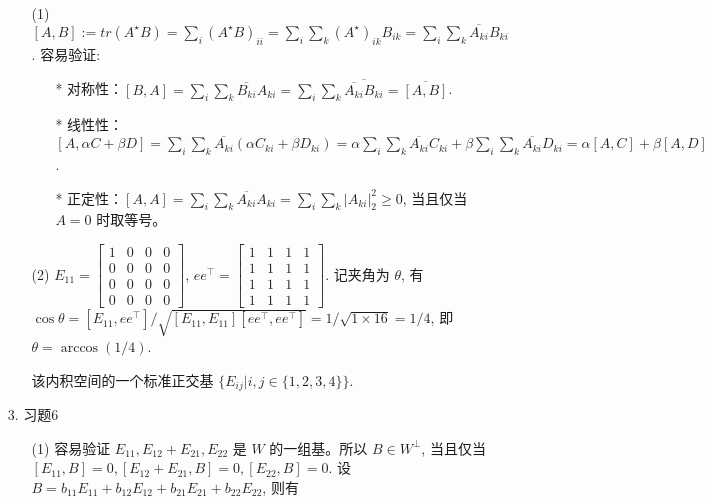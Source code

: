 \documentclass{article}
\begin{document}
\begin{spacing}{1.5}
\begin{enumerate}
    \begin{itemize}
        \item [(1)] $[A, B]:= tr(A^\star B) = \sum_{i} (A^\star B)_{ii} = \sum_{i}\sum_{k} (A^\star)_{ik}B_{ik} = \sum_i\sum_k \overline{A_{ki}}B_{ki}$. 容易验证: 
        \begin{itemize}
            \item [*] 对称性：$[B, A] = \sum_{i}\sum_{k} \overline{B_{ki}}A_{ki} = \sum_i\sum_k \overline{\overline{A_{ki}}B_{ki}} = \overline {[A, B]}$.
            \item [*] 线性性：$[A, \alpha C+ \beta D] = \sum_i\sum_k \overline{A_{ki}}(\alpha C_{ki} + \beta D_{ki}) = \alpha \sum_i\sum_k \overline{A_{ki}}C_{ki} + \beta\sum_i\sum_k \overline{A_{ki}}D_{ki} = \alpha [A, C] + \beta [A, D]$.
            \item [*] 正定性：$[A, A] = \sum_i\sum_k \overline{A_{ki}}A_{ki} = \sum_i\sum_k |A_{ki}|_2^2 \geq 0$, 当且仅当 $A = 0$ 时取等号。
        \end{itemize}
        \item [(2)] $E_{11} = \left[\begin{array}{cccc}1&0&0&0\\0&0&0&0\\0&0&0&0\\0&0&0&0\end{array}\right]$, $ee^\top = \left[\begin{array}{cccc}1&1&1&1\\1&1&1&1\\1&1&1&1\\1&1&1&1\end{array}\right]$. 记夹角为 $\theta$, 有 $\cos \theta = [E_{11}, ee^\top] / \sqrt{[E_{11}, E_{11}][ee^\top, ee^\top]} = 1 / \sqrt{1\times 16} = 1/4$, 即 $\theta = \arccos (1/4)$.
        
        该内积空间的一个标准正交基 $\{E_{ij} | i, j\in\{1,2,3,4\}\}$.
    \end{itemize}

    \item[3.] 习题6
    
    \begin{itemize}
        \item [(1)] 容易验证 $E_{11}, E_{12} + E_{21}, E_{22}$ 是 $W$ 的一组基。所以 $B \in W^\perp$, 当且仅当 $[E_{11}, B] = 0, [E_{12} + E_{21}, B] = 0, [E_{22}, B] = 0$. 设 $B = b_{11}E_{11} + b_{12}E_{12} + b_{21}E_{21} + b_{22}E_{22}$, 则有 
        

\end{itemize}
\end{enumerate}
\end{spacing}
\end{document}
